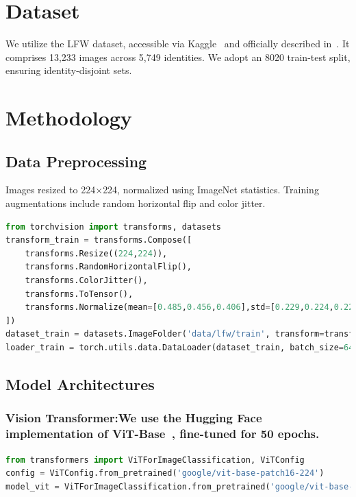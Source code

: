 \documentclass[twocolumn]{IEEEtran}
\begin{document}
\section{Dataset}
We utilize the LFW dataset, accessible via Kaggle~\cite{kaggle_lfw} and officially described in~\cite{huang2008lfw}. It comprises 13,233 images across 5,749 identities. We adopt an 80\/20 train-test split, ensuring identity-disjoint sets.

\section{Methodology}
\subsection{Data Preprocessing}
Images resized to 224\(\times\)224, normalized using ImageNet statistics. Training augmentations include random horizontal flip and color jitter.
\begin{lstlisting}[language=Python, caption=DataLoader and Transforms]
from torchvision import transforms, datasets
transform_train = transforms.Compose([
    transforms.Resize((224,224)),
    transforms.RandomHorizontalFlip(),
    transforms.ColorJitter(),
    transforms.ToTensor(),
    transforms.Normalize(mean=[0.485,0.456,0.406],std=[0.229,0.224,0.225])
])
dataset_train = datasets.ImageFolder('data/lfw/train', transform=transform_train)
loader_train = torch.utils.data.DataLoader(dataset_train, batch_size=64, shuffle=True)
\end{lstlisting}

\subsection{Model Architectures}
\setlength{\parindent}{0pt}
\subsubsection{Vision Transformer:We use the Hugging Face implementation of ViT-Base~\cite{huggingface_vit}, fine-tuned for 50 epochs.}
\begin{lstlisting}[language=Python, caption=ViT Model Initialization]
from transformers import ViTForImageClassification, ViTConfig
config = ViTConfig.from_pretrained('google/vit-base-patch16-224')
model_vit = ViTForImageClassification.from_pretrained('google/vit-base-patch16-224', config=config)
\end{lstlisting}
\end{document}
